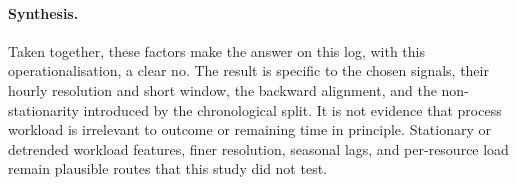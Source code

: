\documentclass[runningheads]{llncs}
\begin{document}
\paragraph{Synthesis.}
Taken together, these factors make the answer on this log, with this
operationalisation, a clear no. The result is specific to the chosen signals,
their hourly resolution and short window, the backward alignment, and the
non-stationarity introduced by the chronological split. It is not evidence that
process workload is irrelevant to outcome or remaining time in principle.
Stationary or detrended workload features, finer resolution, seasonal lags, and
per-resource load remain plausible routes that this study did not test.





\end{document}
